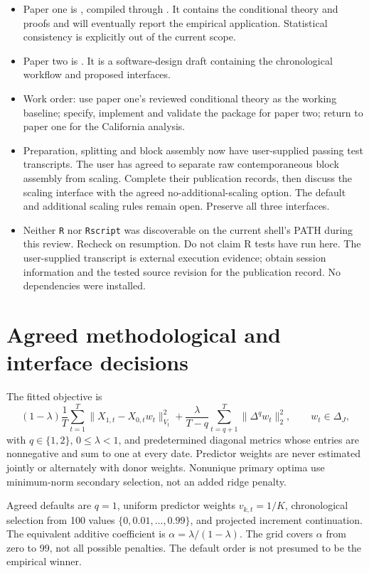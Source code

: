 \documentclass[11pt]{article}
\begin{document}
\begin{itemize}
\item Paper one is , compiled through
. It contains the conditional theory and proofs and will
eventually report the empirical application. Statistical consistency is
explicitly out of the current scope.
\item Paper two is . It is a software-design
draft containing the chronological workflow and proposed interfaces.
\item Work order: use paper one's reviewed conditional theory as the
working baseline; specify, implement and validate the package for paper
two; return to paper one for the California analysis.
\item Preparation, splitting and block assembly now have user-supplied passing test
transcripts. The user has agreed to separate raw contemporaneous block
assembly from scaling. Complete their publication records, then discuss the
scaling interface with the agreed no-additional-scaling option. The default
and additional scaling rules remain open. Preserve all three interfaces.
\item Neither \texttt{R} nor \texttt{Rscript} was discoverable on the
current shell's PATH during this review. Recheck on resumption. Do not
claim R tests have run here. The user-supplied transcript is external
execution evidence; obtain session information and the tested source
revision for the publication record. No dependencies were installed.
\end{itemize}

\section{Agreed methodological and interface decisions}
The fitted objective is
\[
 (1-\lambda)\frac1T\sum_{t=1}^T
 \|X_{1,t}-X_{0,t}w_t\|_{V_t}^2
 +\frac{\lambda}{T-q}\sum_{t=q+1}^T\|\Delta^q w_t\|_2^2,
 \qquad w_t\in\Delta_J,
\]
with $q\in\{1,2\}$, $0\leq\lambda<1$, and predetermined diagonal
metrics whose entries are nonnegative and sum to one at every date.
Predictor weights are never estimated jointly or alternately with donor
weights. Nonunique primary optima use minimum-norm secondary selection,
not an added ridge penalty.

Agreed defaults are $q=1$, uniform predictor weights $v_{k,t}=1/K$,
chronological selection from 100 values
$\{0,0.01,\ldots,0.99\}$, and projected increment continuation.
The equivalent additive coefficient is $\alpha=\lambda/(1-\lambda)$.
The grid covers $\alpha$ from zero to 99, not all possible penalties.
The default order is not presumed to be the empirical winner.
\end{document}
